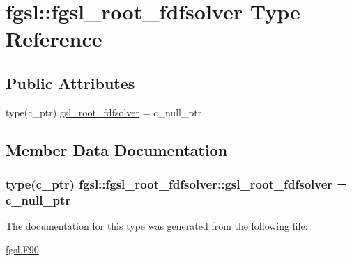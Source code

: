 \hypertarget{structfgsl_1_1fgsl__root__fdfsolver}{}\section{fgsl\+:\+:fgsl\+\_\+root\+\_\+fdfsolver Type Reference}
\label{structfgsl_1_1fgsl__root__fdfsolver}
\subsection*{Public Attributes}
\begin{DoxyCompactItemize}
\item 
type(c\+\_\+ptr) \hyperlink{structfgsl_1_1fgsl__root__fdfsolver_a79a27ae4479bf3af32e15ac53e0ea567}{gsl\+\_\+root\+\_\+fdfsolver} = c\+\_\+null\+\_\+ptr
\end{DoxyCompactItemize}


\subsection{Member Data Documentation}
\hypertarget{structfgsl_1_1fgsl__root__fdfsolver_a79a27ae4479bf3af32e15ac53e0ea567}{}
\subsubsection[{gsl\+\_\+root\+\_\+fdfsolver}]{\setlength{\rightskip}{0pt plus 5cm}type(c\+\_\+ptr) fgsl\+::fgsl\+\_\+root\+\_\+fdfsolver\+::gsl\+\_\+root\+\_\+fdfsolver = c\+\_\+null\+\_\+ptr}\label{structfgsl_1_1fgsl__root__fdfsolver_a79a27ae4479bf3af32e15ac53e0ea567}


The documentation for this type was generated from the following file\+:\begin{DoxyCompactItemize}
\item 
\hyperlink{fgsl_8F90}{fgsl.\+F90}\end{DoxyCompactItemize}
